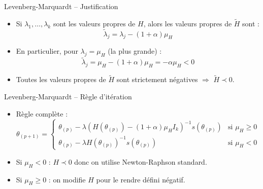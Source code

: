 \documentclass[11pt,aspectratio=169]{beamer}
\begin{document}
\begin{frame}{Levenberg-Marquardt -- Justification}

\begin{itemize}

\item Si $\lambda_1, \ldots, \lambda_k$ sont les valeurs propres de $H$, alors les valeurs propres de $\tilde{H}$ sont :
  \[
  \tilde{\lambda}_j = \lambda_j - (1+\alpha)\mu_H
  \]

\item En particulier, pour $\lambda_j = \mu_H$ (la plus grande) :
  \[
  \tilde{\lambda}_j = \mu_H - (1+\alpha)\mu_H = -\alpha \mu_H < 0
  \]

\item Toutes les valeurs propres de $\tilde{H}$ sont strictement négatives $\Rightarrow$ $\tilde{H} \prec 0$.

\end{itemize}

\end{frame}

\begin{frame}{Levenberg-Marquardt -- Règle d'itération}

\begin{itemize}

\item Règle complète :
  \[
  \theta_{(p+1)} = \begin{cases}
      \theta_{(p)} - \lambda \left(H(\theta_{(p)}) - (1+\alpha)\mu_H I_k\right)^{-1} s(\theta_{(p)}) & \text{si } \mu_H \geq 0 \\[0.3cm]
      \theta_{(p)} - \lambda H(\theta_{(p)})^{-1} s(\theta_{(p)}) & \text{si } \mu_H < 0
  \end{cases}
  \]

\item Si $\mu_H < 0$ : $H \prec 0$ donc on utilise Newton-Raphson standard.\newline

\item Si $\mu_H \geq 0$ : on modifie $H$ pour le rendre défini négatif.

\end{itemize}

\end{frame}
\end{document}
